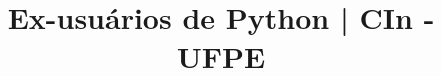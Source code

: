 \documentclass[10pt]{article}
\title{\vspace{-4ex}\Large{Ex-usuários de Python | CIn - UFPE}}
\author{}
\date{}
\begin{document}
\begin{landscape}
\begin{multicols}{2}

\maketitle
\vspace{-13ex}
\tableofcontents
\pagestyle{fancy}



\end{multicols}
\end{landscape}
\end{document}
